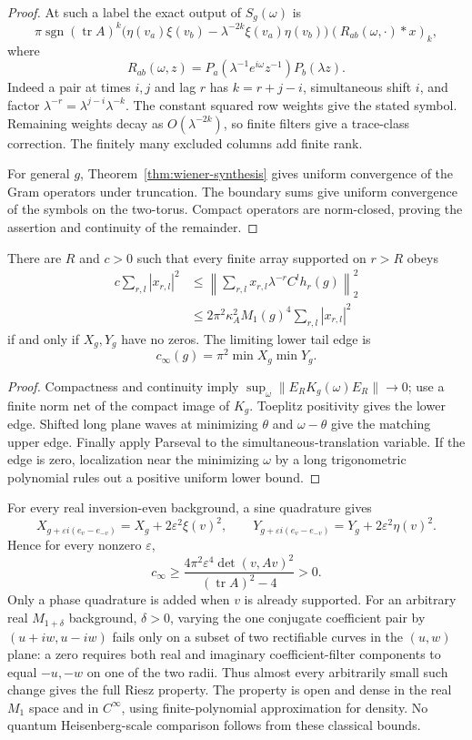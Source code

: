 \begin{proof}
At such a label the exact output of $S_g(\omega)$ is
\[
 \pi\operatorname{sgn}(\operatorname{tr}A)^k
 \bigl(\eta(v_a)\xi(v_b)-\lambda^{-2k}\xi(v_a)\eta(v_b)\bigr)
 (R_{ab}(\omega,\cdot)*x)_k,
\]
where
\[
 R_{ab}(\omega,z)
   =P_a(\lambda^{-1}e^{i\omega}z^{-1})P_b(\lambda z).
\]
Indeed a pair at times $i,j$ and lag $r$ has $k=r+j-i$, simultaneous shift
$i$, and factor $\lambda^{-r}=\lambda^{j-i}\lambda^{-k}$.
The constant squared row weights give the stated symbol. Remaining weights
decay as $O(\lambda^{-2k})$, so finite filters give a trace-class correction.
The finitely many excluded columns add finite rank.

For general $g$, Theorem~\ref{thm:wiener-synthesis} gives uniform convergence
of the Gram operators under truncation. The boundary sums give uniform
convergence of the symbols on the two-torus. Compact operators are
norm-closed, proving the assertion and continuity of the remainder.
\end{proof}

\begin{theorem}\label{thm:full-riesz}
There are $R$ and $c>0$ such that every finite array supported on $r>R$ obeys
\begin{align*}
 c\sum_{r,l}|x_{r,l}|^2
 &\le\left\|\sum_{r,l}x_{r,l}\lambda^{-r}C^lh_r(g)\right\|_2^2\\
 &\le2\pi^2\kappa_A^2M_1(g)^4\sum_{r,l}|x_{r,l}|^2
\end{align*}
if and only if $X_g,Y_g$ have no zeros. The limiting lower tail edge is
\[
 c_\infty(g)=\pi^2\min X_g\min Y_g.
\]
\end{theorem}
\begin{proof}
Compactness and continuity imply
$\sup_\omega\|E_RK_g(\omega)E_R\|\to0$; use a finite norm net of the compact
image of $K_g$. Toeplitz positivity gives the lower edge. Shifted long plane
waves at minimizing $\theta$ and $\omega-\theta$ give the matching upper
edge. Finally apply Parseval to the simultaneous-translation variable.
If the edge is zero, localization near the minimizing $\omega$ by a long
trigonometric polynomial rules out a positive uniform lower bound.
\end{proof}

For every real inversion-even background, a sine quadrature gives
\[
 X_{g+\varepsilon i(e_v-e_{-v})}=X_g+2\varepsilon^2\xi(v)^2,
 \qquad
 Y_{g+\varepsilon i(e_v-e_{-v})}=Y_g+2\varepsilon^2\eta(v)^2.
\]
Hence for every nonzero $\varepsilon$,
\[
 c_\infty\ge
 \frac{4\pi^2\varepsilon^4\det(v,Av)^2}{(\operatorname{tr}A)^2-4}>0.
\]
Only a phase quadrature is added when $v$ is already supported. For an
arbitrary real $M_{1+\delta}$ background, $\delta>0$, varying the one
conjugate coefficient pair by $(u+iw,u-iw)$ fails only on a subset of two
rectifiable curves in the $(u,w)$ plane: a zero requires both real and
imaginary coefficient-filter components to equal $-u,-w$ on one of the two
radii. Thus almost every arbitrarily small such change gives the full Riesz
property. The property is open and dense in the real $M_1$ space and in
$C^\infty$, using finite-polynomial approximation for density.
No quantum Heisenberg-scale comparison follows from these classical bounds.
